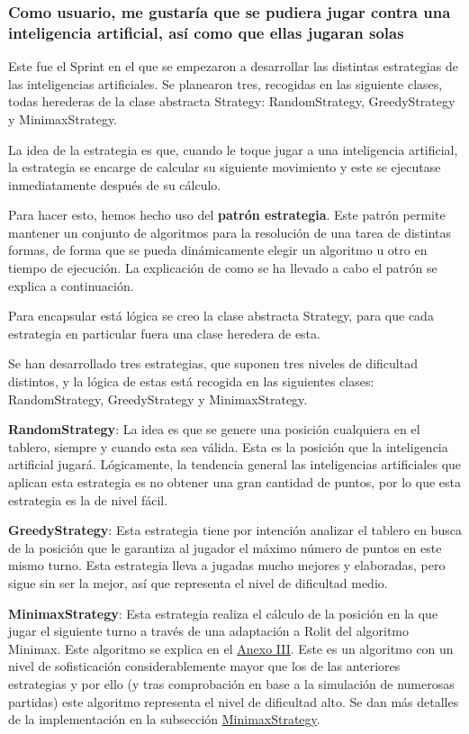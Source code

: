 \documentclass[../DocumentoOficial.tex]{subfiles}
\begin{document}
\subsubsection{Como usuario, me gustaría que se pudiera jugar contra una inteligencia artificial, así como que ellas jugaran solas}
\begin{sprint}[5]
Este fue el Sprint en el que se empezaron a desarrollar las distintas estrategias de las inteligencias artificiales. Se planearon tres, recogidas en las siguiente clases, todas herederas de la clase abstracta Strategy: RandomStrategy, GreedyStrategy y MinimaxStrategy.

La idea de la estrategia es que, cuando le toque jugar a una inteligencia artificial, la estrategia se encarge de calcular su siguiente movimiento y este se ejecutase inmediatamente después de su cálculo.

Para hacer esto, hemos hecho uso del \textbf{patrón estrategia}. Este patrón permite mantener un conjunto de algoritmos para la resolución de una tarea de distintas formas, de forma que se pueda dinámicamente elegir un algoritmo u otro en tiempo de ejecución. La explicación de como se ha llevado a cabo el patrón se explica a continuación.

Para encapsular está lógica se creo la clase abstracta Strategy, para que cada estrategia en particular fuera una clase heredera de esta.

Se han desarrollado tres estrategias, que suponen tres niveles de dificultad distintos, y la lógica de estas está recogida en las siguientes clases: RandomStrategy, GreedyStrategy y MinimaxStrategy.

\textbf{RandomStrategy}:
La idea es que se genere una posición cualquiera en el tablero, siempre y cuando esta sea válida. Esta es la posición que la inteligencia artificial jugará.
Lógicamente, la tendencia general las inteligencias artificiales que aplican esta estrategia es no obtener una gran cantidad de puntos, por lo que esta estrategia es la de nivel fácil.

\textbf{GreedyStrategy}:
Esta estrategia tiene por intención analizar el tablero en busca de la posición que le garantiza al jugador el máximo número de puntos en este mismo turno. Esta estrategia lleva a jugadas mucho mejores y elaboradas, pero sigue sin ser la mejor, así que representa el nivel de dificultad medio.

\textbf{MinimaxStrategy}:
Esta estrategia realiza el cálculo de la posición en la que jugar el siguiente turno a través de una adaptación a Rolit del algoritmo Minimax. Este algoritmo se explica en el \hyperref[ch:AnexoIII]{Anexo III}. Este es un algoritmo con un nivel de sofisticación considerablemente mayor que los de las anteriores estrategias y por ello (y tras comprobación en base a la simulación de numerosas partidas) este algoritmo representa el nivel de dificultad alto. Se dan más detalles de la implementación en la subsección  \hyperref[subsubsec:MinimaxStrategy]{MinimaxStrategy}.


\end{sprint}
\end{document}
